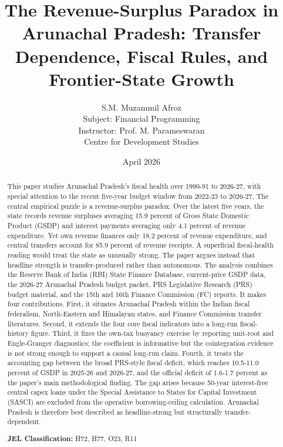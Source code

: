 \documentclass[11pt,a4paper]{article}
\begin{document}
\title{\textbf{The Revenue-Surplus Paradox in Arunachal Pradesh: Transfer Dependence, Fiscal Rules, and Frontier-State Growth}}
\author{S.M. Muzammil Afroz\\
Subject: Financial Programming\\
Instructor: Prof. M. Parameswaran\\
Centre for Development Studies}
\date{April 2026}
\maketitle

\begin{abstract}
This paper studies Arunachal Pradesh's fiscal health over 1990-91 to 2026-27, with special attention to the recent five-year budget window from 2022-23 to 2026-27. The central empirical puzzle is a revenue-surplus paradox. Over the latest five years, the state records revenue surpluses averaging 15.9 percent of Gross State Domestic Product (GSDP) and interest payments averaging only 4.1 percent of revenue expenditure. Yet own revenue finances only 18.2 percent of revenue expenditure, and central transfers account for 85.9 percent of revenue receipts. A superficial fiscal-health reading would treat the state as unusually strong. The paper argues instead that headline strength is transfer-produced rather than autonomous. The analysis combines the Reserve Bank of India (RBI) State Finance Database, current-price GSDP data, the 2026-27 Arunachal Pradesh budget packet, PRS Legislative Research (PRS) budget material, and the 15th and 16th Finance Commission (FC) reports. It makes four contributions. First, it situates Arunachal Pradesh within the Indian fiscal federalism, North-Eastern and Himalayan states, and Finance Commission transfer literatures. Second, it extends the four core fiscal indicators into a long-run fiscal-history figure. Third, it fixes the own-tax buoyancy exercise by reporting unit-root and Engle-Granger diagnostics; the coefficient is informative but the cointegration evidence is not strong enough to support a causal long-run claim. Fourth, it treats the accounting gap between the broad PRS-style fiscal deficit, which reaches 10.5-11.0 percent of GSDP in 2025-26 and 2026-27, and the official deficit of 1.6-1.7 percent as the paper's main methodological finding. The gap arises because 50-year interest-free central capex loans under the Special Assistance to States for Capital Investment (SASCI) are excluded from the operative borrowing-ceiling calculation. Arunachal Pradesh is therefore best described as headline-strong but structurally transfer-dependent.

\vspace{0.5cm}
\noindent \textbf{JEL Classification:} H72, H77, O23, R11
\end{abstract}
\end{document}
